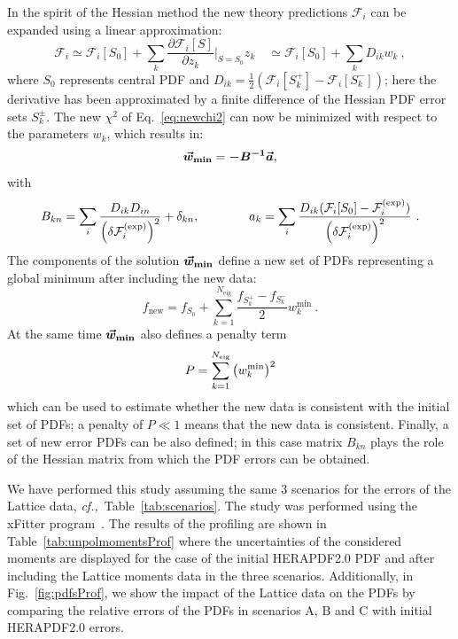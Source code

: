 In the spirit of the Hessian method the new theory predictions $\mathcal{F}_i$ can be expanded
using a linear approximation:
\begin{equation}
\mathcal{F}_i \simeq \mathcal{F}_i[S_0] + \sum_k \frac{\partial\mathcal{F}_i[S]}{\partial z_k}\bigg|_{S=S_0} z_k \quad
              \simeq \mathcal{F}_i[S_0] + \sum_k D_{ik} w_k \ ,
\end{equation}
where $S_0$ represents central PDF and $D_{ik}=\frac{1}{2}(\mathcal{F}_i[S_k^+]-\mathcal{F}_i[S_k^-])$;
here the  derivative has been approximated by a finite difference of the 
Hessian PDF error sets $S_k^{\pm}$.
%
The new $\chi^2$ of Eq.~\eqref{eq:newchi2} can now be minimized with respect to the parameters $w_k$,
which results in:
\begin{equation}
\boldsymbol{\vec{w}_{\text{{\bf min}}}} = \boldsymbol{-B^{-1}} \boldsymbol{\vec{a}},
\end{equation}
with
\begin{equation}
B_{kn} = \sum_i {{D_{ik}D_{in}}\over {\left(\delta\mathcal{F}_i^{\rm(exp)}\right)^2}} + \delta_{kn},
\qquad
\qquad
a_k = \sum_i {{D_{ik}(\mathcal{F}_i[S_0] - \mathcal{F}_i^{\rm(exp)})}\over {\left(\delta\mathcal{F}_i^{\rm(exp)}\right)^2}} \ . 
\end{equation}
%
The components of the solution $\boldsymbol{\vec{w}_{\text{{\bf min}}}}$ define a new set
of PDFs representing a global minimum after including the new data:
\begin{equation}
f_{\text{new}} = f_{S_0} + \sum_{k=1}^{N_{\text{eig}}} \frac{f_{S_k^+}-f_{S_k^-}}{2} w_k^{\text{min}} \ .
\end{equation}
At the same time $\boldsymbol{\vec{w}_{\text{{\bf min}}}}$ also  defines  a penalty term 
\begin{equation}
P = \sum_{k=1}^{N_{\text{eig}}} \left( w_k^{\text{min}} \right)^2
\end{equation}
which can be used to estimate whether the new data is consistent with the initial set of PDFs;
a penalty of $P\ll1$ means that the new data is consistent.
%
Finally, a set of new error PDFs can be also defined; in this case matrix $B_{kn}$ plays the role of
the Hessian matrix from which the PDF errors can be obtained. 

We have performed this study assuming the same 3 scenarios for the errors of the Lattice data,
{\it cf.,}~Table~\ref{tab:scenarios}. 
The study was performed using the xFitter program~\cite{Alekhin:2014irh}.
%
The results of the profiling are shown in Table~\ref{tab:unpolmomentsProf} where the uncertainties
of the considered moments are displayed for the case of the initial HERAPDF2.0 PDF and after including the Lattice
moments data in the three scenarios.
%
%
Additionally, in Fig.~\ref{fig:pdfsProf}, we show the impact of the Lattice data on the PDFs by
comparing the relative errors of the PDFs in scenarios A, B and C with initial HERAPDF2.0 errors.

